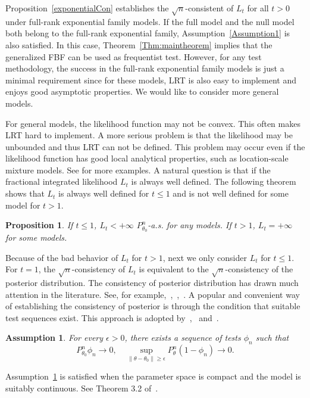 \documentclass[11pt]{article}
\theoremstyle{plain}
\newtheorem{proposition}{\quad\quad Proposition}
\newtheorem{assumption}{\quad\quad Assumption}
\theoremstyle{definition}
\theoremstyle{remark}
\begin{document}
Proposition~\ref{exponentialCon} establishes the $\sqrt{n}$-consistent of $L_t$ for all $t>0$ under full-rank exponential family models.
If the full model and the null model both belong to the full-rank exponential family, Assumption~\ref{Assumption1} is also satisfied.
In this case, Theorem~\ref{Thm:maintheorem} implies that the generalized FBF can be used as frequentist test.
However,
for any test methodology, the success in the full-rank exponential family models is just a minimal requirement 
since for these models, LRT is also easy to implement and enjoys good asymptotic properties.
We would like to consider more general models.


For general models, the likelihood function may not be convex.
This often makes LRT hard to implement.
A more serious problem is that the likelihood may be unbounded and thus LRT can not be defined.
This problem may occur even if the likelihood function has good local analytical properties, such as location-scale mixture models.  See \cite{Cam1990Maximum} for more examples.
A natural question is that if the fractional integrated likelihood $L_t$ is always well defined.
The following theorem shows that $L_t$ is always well defined for $t\leq 1$ and is not well defined for some model for $t>1$.
\begin{proposition}
    If $t\leq 1$, $L_t< +\infty$ $P_{\theta_0}^n$-a.s. for any models. If $t> 1$, $L_t = +\infty$ for some models.
    \label{exprop}
\end{proposition}



Because of the bad behavior of $L_t$ for $t>1$, next we only consider $L_t$ for $t\leq 1$.
 For $t=1$, the $\sqrt{n}$-consistency of $L_t$ is equivalent to the $\sqrt{n}$-consistency of the posterior distribution.
 The consistency of posterior distribution has drawn much attention in the literature.
 See, for example,~\cite{ghosal2000},~\cite{Shen2001Rates},~\cite{vaart2007convergence}.
A popular and convenient way of establishing the consistency of posterior is through the condition that suitable test sequences exist.
This approach is adopted by~\cite{ghosal2000},~\cite{vaart2007convergence} and~\cite{Kleijn2012The}.

\begin{assumption}\label{Assumption2}
    For every $\epsilon>0$, there exists a sequence of tests $\phi_n$ such that
        \begin{equation*}
            P_{\theta_0}^n\phi_n\to 0,\quad \sup_{\|\theta-\theta_0\|\geq \epsilon} P_\theta^n(1-\phi_n)\to 0.
        \end{equation*}
\end{assumption}
Assumption~\ref{Assumption2} is satisfied when the parameter space is compact and the model is suitably continuous. See Theorem 3.2 of~\cite{Kleijn2012The}.
\end{document}

